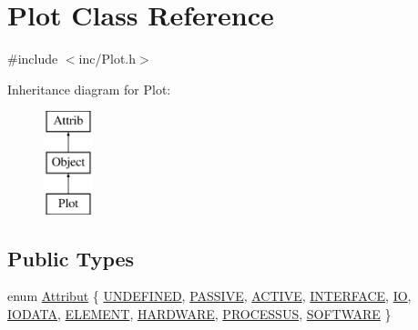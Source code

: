\hypertarget{classPlot}{}\section{Plot Class Reference}
\label{classPlot}


{\ttfamily \#include $<$inc/\+Plot.\+h$>$}

Inheritance diagram for Plot\+:\begin{figure}[H]
\begin{center}
\leavevmode
\includegraphics[height=3.000000cm]{classPlot}
\end{center}
\end{figure}
\subsection*{Public Types}
\begin{DoxyCompactItemize}
\item 
enum \hyperlink{classAttrib_a69e171d7cc6417835a5a306d3c764235}{Attribut} \{ \newline
\hyperlink{classAttrib_a69e171d7cc6417835a5a306d3c764235a3a8da2ab97dda18aebab196fe4100531}{U\+N\+D\+E\+F\+I\+N\+ED}, 
\hyperlink{classAttrib_a69e171d7cc6417835a5a306d3c764235a2bfb2af57b87031d190a05fe25dd92ed}{P\+A\+S\+S\+I\+VE}, 
\hyperlink{classAttrib_a69e171d7cc6417835a5a306d3c764235a3b1fec929c0370d1436f2f06e298fb0d}{A\+C\+T\+I\+VE}, 
\hyperlink{classAttrib_a69e171d7cc6417835a5a306d3c764235aa27c16b480a369ea4d18b07b2516bbc7}{I\+N\+T\+E\+R\+F\+A\+CE}, 
\newline
\hyperlink{classAttrib_a69e171d7cc6417835a5a306d3c764235a1420a5b8c0540b2af210b6975eded7f9}{IO}, 
\hyperlink{classAttrib_a69e171d7cc6417835a5a306d3c764235a0af3b0d0ac323c1704e6c69cf90add28}{I\+O\+D\+A\+TA}, 
\hyperlink{classAttrib_a69e171d7cc6417835a5a306d3c764235a7788bc5dd333fd8ce18562b269c9dab1}{E\+L\+E\+M\+E\+NT}, 
\hyperlink{classAttrib_a69e171d7cc6417835a5a306d3c764235a61ceb22149f365f1780d18f9d1459423}{H\+A\+R\+D\+W\+A\+RE}, 
\newline
\hyperlink{classAttrib_a69e171d7cc6417835a5a306d3c764235a75250e29692496e73effca2c0330977f}{P\+R\+O\+C\+E\+S\+S\+US}, 
\hyperlink{classAttrib_a69e171d7cc6417835a5a306d3c764235a103a67cd0b8f07ef478fa45d4356e27b}{S\+O\+F\+T\+W\+A\+RE}
 \}
\end{DoxyCompactItemize}

